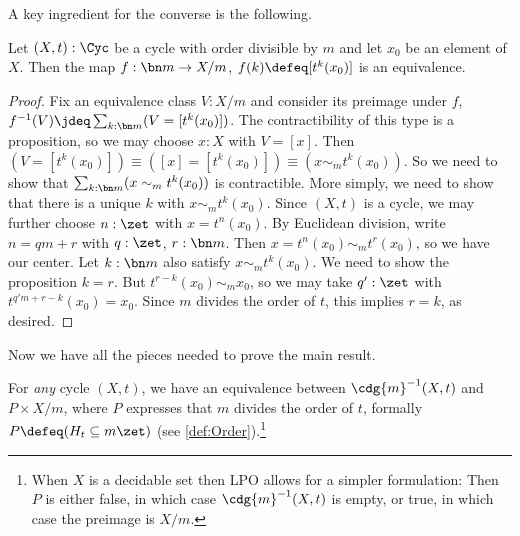 A key ingredient for the converse is the following.
\begin{lemma}\label{lem:X-mod-m-chosen}
  Let $(X,t):\Cyc$ be a cycle with order divisible by $m$
  and let $x_0$ be an element of $X$.
  Then the map $f : \bn m \to X/m$, $f(k) \defeq [t^k(x_0)]$
  is an equivalence.
\end{lemma}
\begin{proof}
  Fix an equivalence class $V:X/m$
  and consider its
  preimage under $f$, $f^{-1}(V) \jdeq \sum_{k:\bn m}(V=[t^k(x_0)])$.
  The contractibility of this type is a proposition, so we may choose
  $x:X$ with $V=[x]$.
  Then $(V=[t^k(x_0)])\equiv([x]=[t^k(x_0)])\equiv(x\sim_m t^k(x_0))$.
  So we need to show that $\sum_{k:\bn m}(x\sim_m t^k(x_0))$ is contractible.
  More simply, we need to show that there is a unique $k$ with $x\sim_m t^k(x_0)$.
  Since $(X,t)$ is a cycle, we may further choose $n:\zet$ with $x=t^n(x_0)$.
  By Euclidean division, write $n=qm+r$ with $q:\zet$, $r:\bn m$.
  Then $x = t^n(x_0) \sim_m t^r(x_0)$, so we have our center.
  Let $k:\bn m$ also satisfy $x\sim_m t^k(x_0)$.
  We need to show the proposition $k=r$.
  But $t^{r-k}(x_0) \sim_m x_0$, so we may take $q':\zet$
  with $t^{q'm+r-k}(x_0)=x_0$.
  Since $m$ divides the order of $t$, this implies $r=k$, as desired.
\end{proof}
Now we have all the pieces needed to prove the main result.
\begin{construction}\label{thm:fiber-cdg}
  For \emph{any} cycle $(X,t)$, we have an equivalence
  between $\cdg{m}^{-1}(X,t)$ and
  $P\times X/m$, where $P$ expresses that $m$
  divides the order of $t$, formally
  $P \defeq (H_t \subseteq m\zet)$ (see \cref{def:Order}).\footnote{%
  When $X$ is a decidable set then LPO allows for a simpler formulation:
  Then $P$ is either false, in which case $\cdg{m}^{-1}(X,t)$ is empty,
  or true, in which case the preimage is $X/m$.
  }
\end{construction}
